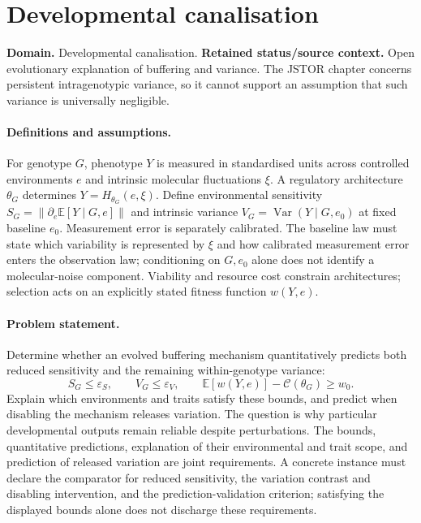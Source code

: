 \documentclass[11pt]{article}
\begin{document}
\section*{Developmental canalisation}
\label{prob:139}
\label{rank:147}
\par\smallskip

\noindent\textbf{Domain.} Developmental canalisation. \quad \textbf{Retained status/source context.} Open evolutionary explanation of buffering and variance. The JSTOR chapter concerns persistent intragenotypic variance, so it cannot support an assumption that such variance is universally negligible.
\paragraph{Definitions and assumptions.} For genotype $G$, phenotype $Y$ is measured in standardised units across controlled environments $e$ and intrinsic molecular fluctuations $\xi$. A regulatory architecture $\theta_G$ determines $Y=H_{\theta_G}(e,\xi)$. Define environmental sensitivity $S_G=\|\partial_e\mathbb{E}[Y\mid G,e]\|$ and intrinsic variance $V_G=\operatorname{Var}(Y\mid G,e_0)$ at fixed baseline $e_0$. Measurement error is separately calibrated. The baseline law must state which variability is represented by $\xi$ and how calibrated measurement error enters the observation law; conditioning on $G,e_0$ alone does not identify a molecular-noise component. Viability and resource cost constrain architectures; selection acts on an explicitly stated fitness function $w(Y,e)$.
\paragraph{Problem statement.} Determine whether an evolved buffering mechanism quantitatively predicts both reduced sensitivity and the remaining within-genotype variance:
\[
S_G\leq\varepsilon_S,\qquad V_G\leq\varepsilon_V,
\qquad
\mathbb{E}[w(Y,e)]-\mathcal C(\theta_G)\geq w_0.
\]
Explain which environments and traits satisfy these bounds, and predict when disabling the mechanism releases variation. The question is why particular developmental outputs remain reliable despite perturbations. The bounds, quantitative predictions, explanation of their environmental and trait scope, and prediction of released variation are joint requirements. A concrete instance must declare the comparator for reduced sensitivity, the variation contrast and disabling intervention, and the prediction-validation criterion; satisfying the displayed bounds alone does not discharge these requirements.
\end{document}
